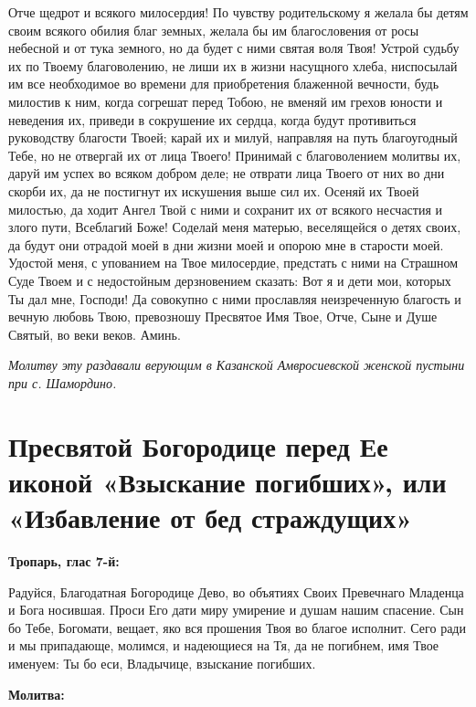 Отче щедрот и всякого милосердия! По чувству родительскому я желала бы детям своим всякого обилия благ земных, желала бы им благословения от росы небесной и от тука земного, но да будет с ними святая воля Твоя! Устрой судьбу их по Твоему благоволению, не лиши их в жизни насущного хлеба, ниспосылай им все необходимое во времени для приобретения блаженной вечности, будь милостив к ним, когда согрешат перед Тобою, не вменяй им грехов юности и неведения их, приведи в сокрушение их сердца, когда будут противиться руководству благости Твоей; карай их и милуй, направляя на путь благоугодный Тебе, но не отвергай их от лица Твоего! Принимай с благоволением молитвы их, даруй им успех во всяком добром деле; не отврати лица Твоего от них во дни скорби их, да не постигнут их искушения выше сил их. Осеняй их Твоей милостью, да ходит Ангел Твой с ними и сохранит их от всякого несчастия и злого пути, Всеблагий Боже! Соделай меня матерью, веселящейся о детях своих, да будут они отрадой моей в дни жизни моей и опорою мне в старости моей. Удостой меня, с упованием на Твое милосердие, предстать с ними на Страшном Суде Твоем и с недостойным дерзновением сказать: Вот я и дети мои, которых Ты дал мне, Господи! Да совокупно с ними прославляя неизреченную благость и вечную любовь Твою, превозношу Пресвятое Имя Твое, Отче, Сыне и Душе Святый, во веки веков. Аминь.

\itshape Молитву эту раздавали верующим в Казанской Амвросиевской женской пустыни при с. Шамордино.

\normalfont{}





\newpage\section{Пресвятой Богородице перед Ее иконой «Взыскание погибших», или «Избавление от бед страждущих»}
 
\bfseries Тропарь, глас 7-й:\normalfont{}


Радуйся, Благодатная Богородице Дево, во объятиях Своих Превечнаго Младенца и Бога носившая. Проси Его дати миру умирение и душам нашим спасение. Сын бо Тебе, Богомати, вещает, яко вся прошения Твоя во благое исполнит. Сего ради и мы припадающе, молимся, и надеющиеся на Тя, да не погибнем, имя Твое именуем: Ты бо еси, Владычице, взыскание погибших.


\medskip
\bfseries Молитва:\normalfont{}


